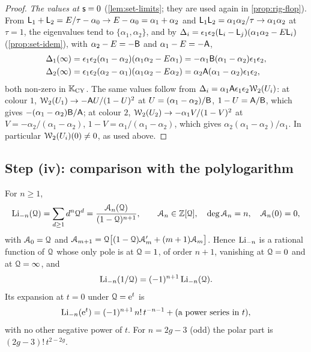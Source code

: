 \begin{proof}
\emph{The values at $\mathsf{s}=0$} (\cref{lem:set-limits}; they are used again in \cref{prop:rig-flop}). From $\mathsf{L}_1+\mathsf{L}_2=E/\tau-\alpha_0\to E-\alpha_0=\alpha_1+\alpha_2$ and $\mathsf{L}_1\mathsf{L}_2=\alpha_1\alpha_2/\tau\to\alpha_1\alpha_2$ at $\tau=1$, the eigenvalues tend to $\{\alpha_1,\alpha_2\}$, and by $\Delta_i=\epsilon_1\epsilon_2(\mathsf{L}_i-\mathsf{L}_j)(\alpha_1\alpha_2-E\mathsf{L}_i)$ (\cref{prop:set-idem}), with $\alpha_2-E=-\mathsf{B}$ and $\alpha_1-E=-\mathsf{A}$,
\begin{align}
\Delta_1(\infty)&=\epsilon_1\epsilon_2(\alpha_1-\alpha_2)(\alpha_1\alpha_2-E\alpha_1)=-\alpha_1\mathsf{B}(\alpha_1-\alpha_2)\epsilon_1\epsilon_2,\notag\\
\Delta_2(\infty)&=\epsilon_1\epsilon_2(\alpha_2-\alpha_1)(\alpha_1\alpha_2-E\alpha_2)=\alpha_2\mathsf{A}(\alpha_1-\alpha_2)\epsilon_1\epsilon_2,
\label{eq:rig-Dinf}
\end{align}
both non-zero in $\mathbb{K}_{\mathrm{CY}}$. The same values follow from $\Delta_i=\alpha_1\mathsf{A}\epsilon_1\epsilon_2\mathcal{W}_2(U_i)$: at colour $1$, $\mathcal{W}_2(U_1)\to-\mathsf{A} U/(1-U)^2$ at $U=(\alpha_1-\alpha_2)/\mathsf{B}$, $1-U=\mathsf{A}/\mathsf{B}$, which gives $-(\alpha_1-\alpha_2)\mathsf{B}/\mathsf{A}$; at colour $2$, $\mathcal{W}_2(U_2)\to-\alpha_1V/(1-V)^2$ at $V=-\alpha_2/(\alpha_1-\alpha_2)$, $1-V=\alpha_1/(\alpha_1-\alpha_2)$, which gives $\alpha_2(\alpha_1-\alpha_2)/\alpha_1$. In particular $\mathcal{W}_2(U_i)(0)\neq 0$, as used above.
\end{proof}

\subsection{Step (iv): comparison with the polylogarithm}

\begin{lem}
\label{lem:rig-li}
For $n\geq 1$,
\[
\operatorname{Li}_{-n}(\mathcal{Q})=\sum_{d\geq 1}d^n\mathcal{Q}^d=\frac{\mathcal{A}_n(\mathcal{Q})}{(1-\mathcal{Q})^{n+1}},\qquad \mathcal{A}_n\in\mathbb{Z}[\mathcal{Q}],\quad\deg\mathcal{A}_n=n,\quad\mathcal{A}_n(0)=0,
\]
with $\mathcal{A}_0=\mathcal{Q}$ and $\mathcal{A}_{m+1}=\mathcal{Q}\big[(1-\mathcal{Q})\mathcal{A}_m'+(m+1)\mathcal{A}_m\big]$. Hence $\operatorname{Li}_{-n}$ is a rational function of $\mathcal{Q}$ whose only pole is at $\mathcal{Q}=1$, of order $n+1$, vanishing at $\mathcal{Q}=0$ and at $\mathcal{Q}=\infty$, and
\[
\operatorname{Li}_{-n}(1/\mathcal{Q})=(-1)^{n+1}\operatorname{Li}_{-n}(\mathcal{Q}).
\]
Its expansion at $t=0$ under $\mathcal{Q}=\mathrm{e}^{t}$ is
\[
\operatorname{Li}_{-n}(\mathrm{e}^{t})=(-1)^{n+1}\,n!\,t^{-n-1}+(\text{a power series in }t),
\]
with no other negative power of $t$. For $n=2g-3$ (odd) the polar part is $(2g-3)!\,t^{2-2g}$.
\end{lem}

